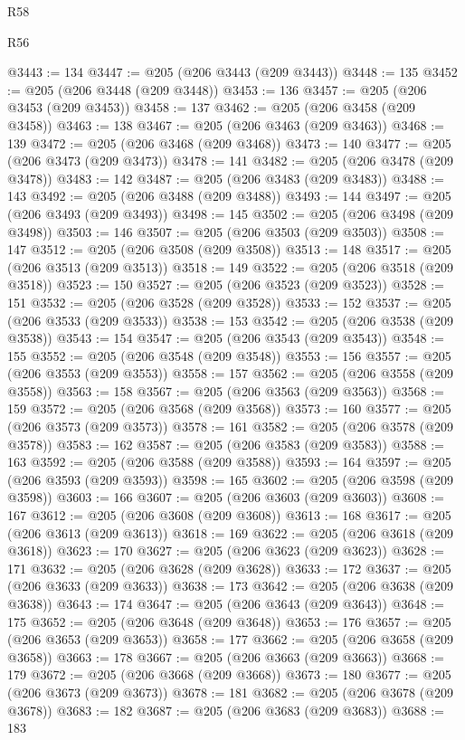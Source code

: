\begin{lexlean}{R58}
\begin{lexlean}{R56}
\begin{coremodule}
{{{{{{{{{{{{{{{{{{{{{{{{{{{{{{{{{{{{{{{{{{{{{{{{{{{{{{{{{{{{{{{{{{{{{{{{{{{{{{{{{{{{{{{{{{{{{{{{{{{{{{{{{{{{{{{{{{{{{{{{{{{{{{{{{{{{{{{{{{{{{{{{{{{{{{{{{{{{{{{{{{{{{{{{{{{{{{{{{{{{{{{{{{{{{{{{{{{{{{{{{{{{{{{{{{{@3443 := 134
@3447 := @205 (@206 @3443 (@209 @3443))
@3448 := 135
@3452 := @205 (@206 @3448 (@209 @3448))
@3453 := 136
@3457 := @205 (@206 @3453 (@209 @3453))
@3458 := 137
@3462 := @205 (@206 @3458 (@209 @3458))
@3463 := 138
@3467 := @205 (@206 @3463 (@209 @3463))
@3468 := 139
@3472 := @205 (@206 @3468 (@209 @3468))
@3473 := 140
@3477 := @205 (@206 @3473 (@209 @3473))
@3478 := 141
@3482 := @205 (@206 @3478 (@209 @3478))
@3483 := 142
@3487 := @205 (@206 @3483 (@209 @3483))
@3488 := 143
@3492 := @205 (@206 @3488 (@209 @3488))
@3493 := 144
@3497 := @205 (@206 @3493 (@209 @3493))
@3498 := 145
@3502 := @205 (@206 @3498 (@209 @3498))
@3503 := 146
@3507 := @205 (@206 @3503 (@209 @3503))
@3508 := 147
@3512 := @205 (@206 @3508 (@209 @3508))
@3513 := 148
@3517 := @205 (@206 @3513 (@209 @3513))
@3518 := 149
@3522 := @205 (@206 @3518 (@209 @3518))
@3523 := 150
@3527 := @205 (@206 @3523 (@209 @3523))
@3528 := 151
@3532 := @205 (@206 @3528 (@209 @3528))
@3533 := 152
@3537 := @205 (@206 @3533 (@209 @3533))
@3538 := 153
@3542 := @205 (@206 @3538 (@209 @3538))
@3543 := 154
@3547 := @205 (@206 @3543 (@209 @3543))
@3548 := 155
@3552 := @205 (@206 @3548 (@209 @3548))
@3553 := 156
@3557 := @205 (@206 @3553 (@209 @3553))
@3558 := 157
@3562 := @205 (@206 @3558 (@209 @3558))
@3563 := 158
@3567 := @205 (@206 @3563 (@209 @3563))
@3568 := 159
@3572 := @205 (@206 @3568 (@209 @3568))
@3573 := 160
@3577 := @205 (@206 @3573 (@209 @3573))
@3578 := 161
@3582 := @205 (@206 @3578 (@209 @3578))
@3583 := 162
@3587 := @205 (@206 @3583 (@209 @3583))
@3588 := 163
@3592 := @205 (@206 @3588 (@209 @3588))
@3593 := 164
@3597 := @205 (@206 @3593 (@209 @3593))
@3598 := 165
@3602 := @205 (@206 @3598 (@209 @3598))
@3603 := 166
@3607 := @205 (@206 @3603 (@209 @3603))
@3608 := 167
@3612 := @205 (@206 @3608 (@209 @3608))
@3613 := 168
@3617 := @205 (@206 @3613 (@209 @3613))
@3618 := 169
@3622 := @205 (@206 @3618 (@209 @3618))
@3623 := 170
@3627 := @205 (@206 @3623 (@209 @3623))
@3628 := 171
@3632 := @205 (@206 @3628 (@209 @3628))
@3633 := 172
@3637 := @205 (@206 @3633 (@209 @3633))
@3638 := 173
@3642 := @205 (@206 @3638 (@209 @3638))
@3643 := 174
@3647 := @205 (@206 @3643 (@209 @3643))
@3648 := 175
@3652 := @205 (@206 @3648 (@209 @3648))
@3653 := 176
@3657 := @205 (@206 @3653 (@209 @3653))
@3658 := 177
@3662 := @205 (@206 @3658 (@209 @3658))
@3663 := 178
@3667 := @205 (@206 @3663 (@209 @3663))
@3668 := 179
@3672 := @205 (@206 @3668 (@209 @3668))
@3673 := 180
@3677 := @205 (@206 @3673 (@209 @3673))
@3678 := 181
@3682 := @205 (@206 @3678 (@209 @3678))
@3683 := 182
@3687 := @205 (@206 @3683 (@209 @3683))
@3688 := 183
}}}}}}}}}}}}}}}}}}}}}}}}}}}}}}}}}}}}}}}}}}}}}}}}}}}}}}}}}}}}}}}}}}}}}}}}}}}}}}}}}}}}}}}}}}}}}}}}}}}}}}}}}}}}}}}}}}}}}}}}}}}}}}}}}}}}}}}}}}}}}}}}}}}}}}}}}}}}}}}}}}}}}}}}}}}}}}}}}}}}}}}}}}}}}}}}}}}}}}}}}}}}}}}}}}}
\end{coremodule}
\end{lexlean}
\end{lexlean}
